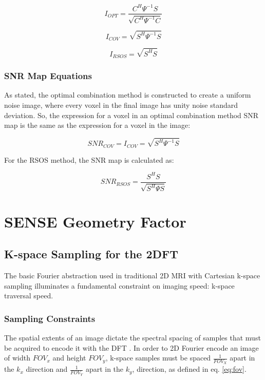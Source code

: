 \begin{equation} \label{eq:I_OPT}
I_{OPT}=\frac{C^H\Psi^{-1}S}{\sqrt{C^H\Psi^{-1}C}}
\end{equation}

\begin{equation} \label{eq:I_COV}
I_{COV}=\sqrt{S^H\Psi^{-1}S}
\end{equation}

\begin{equation} \label{eq:I_RSOS}
I_{RSOS}=\sqrt{S^{H} S}
\end{equation}

\subsubsection{SNR Map Equations}

As stated, the optimal combination method is constructed to create a uniform noise image, where every voxel in the final
image has unity noise standard deviation. So, the expression for a voxel in an optimal combination method SNR map is the
same as the expression for a voxel in the image:

\begin{equation} \label{eq:SNR_COV}
    SNR_{COV}= I_{COV} = \sqrt{S^H\Psi^{-1}S}
\end{equation}

For the RSOS method, the SNR map is calculated as:

\begin{equation} \label{eq:SNR_RSOS}
    SNR_{RSOS}= \frac{S^HS}{\sqrt{S^H \Psi S}}
\end{equation}

\section{SENSE Geometry Factor}

\subsection{K-space Sampling for the 2DFT}
The basic Fourier abstraction used in traditional 2D MRI with Cartesian k-space sampling illuminates a fundamental
constraint on imaging speed: k-space traversal speed.

\subsubsection{Sampling Constraints}
The spatial extents of an image dictate the spectral spacing of samples that must be acquired to encode it with the DFT
\cite{nishimura}. In order to 2D Fourier encode an image of width $FOV_x$ and height $FOV_y$, k-space samples must be
spaced $\frac{1}{FOV_X}$ apart in the $k_x$ direction and $\frac{1}{FOV_Y}$ apart in the $k_y$, direction, as defined in
eq. \ref{eq:fov}.

